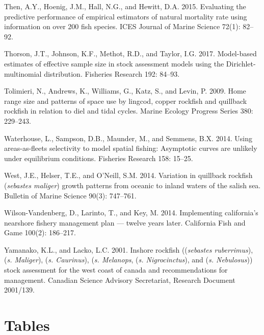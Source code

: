 \documentclass[11pt,
  english,
  letterpaper,
]{article}
\begin{document}
\leavevmode\hypertarget{ref-then_evaluating_2015-1}{}%
Then, A.Y., Hoenig, J.M., Hall, N.G., and Hewitt, D.A. 2015. Evaluating the predictive performance of empirical estimators of natural mortality rate using information on over 200 fish species. ICES Journal of Marine Science 72(1): 82--92.

\leavevmode\hypertarget{ref-thorson_model-based_2017}{}%
Thorson, J.T., Johnson, K.F., Methot, R.D., and Taylor, I.G. 2017. Model-based estimates of effective sample size in stock assessment models using the Dirichlet-multinomial distribution. Fisheries Research 192: 84--93.

\leavevmode\hypertarget{ref-tolimieri_home_2009}{}%
Tolimieri, N., Andrews, K., Williams, G., Katz, S., and Levin, P. 2009. Home range size and patterns of space use by lingcod, copper rockfish and quillback rockfish in relation to diel and tidal cycles. Marine Ecology Progress Series 380: 229--243.

\leavevmode\hypertarget{ref-Waterhouseetal_spatialSelex_2014}{}%
Waterhouse, L., Sampson, D.B., Maunder, M., and Semmens, B.X. 2014. Using areas-as-fleets selectivity to model spatial fishing: Asymptotic curves are unlikely under equilibrium conditions. Fisheries Research 158: 15--25.

\leavevmode\hypertarget{ref-Westetal_2014}{}%
West, J.E., Helser, T.E., and O'Neill, S.M. 2014. Variation in quillback rockfish (\emph{sebastes maliger}) growth patterns from oceanic to inland waters of the salish sea. Bulletin of Marine Science 90(3): 747--761.

\leavevmode\hypertarget{ref-Wilson-Vandenbergetal_2014}{}%
Wilson-Vandenberg, D., Larinto, T., and Key, M. 2014. Implementing california's nearshore fishery management plan --- twelve years later. California Fish and Game 100(2): 186--217.

\leavevmode\hypertarget{ref-YamanakaandLacko_rockfish_2001}{}%
Yamanako, K.L., and Lacko, L.C. 2001. Inshore rockfish ((\emph{sebastes ruberrimus}), (\emph{s. Maliger}), (\emph{s. Caurinus}), (\emph{s. Melanops}, (\emph{s. Nigrocinctus}), and (\emph{s. Nebulosus})) stock assessment for the west coast of canada and recommendations for management. Canadian Science Advisory Secretariat, Research Document 2001/139.

\leavevmode\tagmcend\tagstructend

\clearpage


\hypertarget{tables}{%
\section{Tables}\label{tables}}
\end{document}
